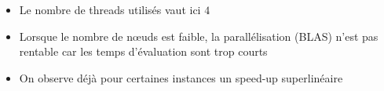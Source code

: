 \documentclass{beamer}
\begin{document}
\begin{frame}
\begin{itemize}
\item Le nombre de threads utilisés vaut ici $4$
\item Lorsque le nombre de n\oe uds est faible, la parallélisation (BLAS) n'est pas rentable car les temps d'évaluation sont trop courts
\item On observe déjà pour certaines instances un speed-up superlinéaire
\end{itemize}

%    
% 


\end{frame}

\end{document}
